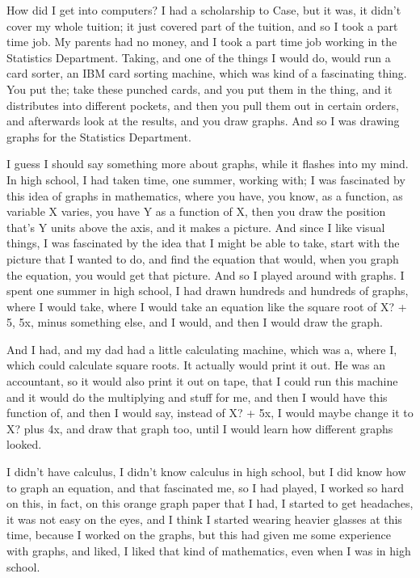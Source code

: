 \documentclass[]{article}
\begin{document}
How did I get into computers? I had a scholarship to Case, but it was,
it didn't cover my whole tuition; it just covered part of the tuition,
and so I took a part time job. My parents had no money, and I took a
part time job working in the Statistics Department. Taking, and one of
the things I would do, would run a card sorter, an IBM card sorting
machine, which was kind of a fascinating thing. You put the; take these
punched cards, and you put them in the thing, and it distributes into
different pockets, and then you pull them out in certain orders, and
afterwards look at the results, and you draw graphs. And so I was
drawing graphs for the Statistics Department.

I guess I should say something more about graphs, while it flashes into
my mind. In high school, I had taken time, one summer, working with; I
was fascinated by this idea of graphs in mathematics, where you have,
you know, as a function, as variable X varies, you have Y as a function
of X, then you draw the position that's Y units above the axis, and it
makes a picture. And since I like visual things, I was fascinated by the
idea that I might be able to take, start with the picture that I wanted
to do, and find the equation that would, when you graph the equation,
you would get that picture. And so I played around with graphs. I spent
one summer in high school, I had drawn hundreds and hundreds of graphs,
where I would take, where I would take an equation like the square root
of X? + 5, 5x, minus something else, and I would, and then I would draw
the graph.

And I had, and my dad had a little calculating machine, which was a,
where I, which could calculate square roots. It actually would print it
out. He was an accountant, so it would also print it out on tape, that I
could run this machine and it would do the multiplying and stuff for me,
and then I would have this function of, and then I would say, instead of
X? + 5x, I would maybe change it to X? plus 4x, and draw that graph too,
until I would learn how different graphs looked.

I didn't have calculus, I didn't know calculus in high school, but I did
know how to graph an equation, and that fascinated me, so I had played,
I worked so hard on this, in fact, on this orange graph paper that I
had, I started to get headaches, it was not easy on the eyes, and I
think I started wearing heavier glasses at this time, because I worked
on the graphs, but this had given me some experience with graphs, and
liked, I liked that kind of mathematics, even when I was in high school.
\end{document}
